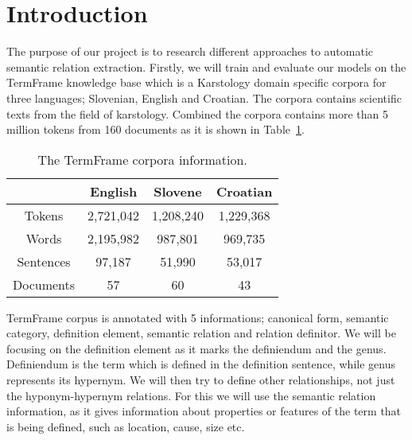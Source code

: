 \documentclass[fleqn,moreauthors,10pt]{ds_report}
\affiliation{\textit{Advisors: Slavko Žitnik}}
\begin{document}
\flushbottom 

\maketitle 

\thispagestyle{empty} 


\section*{Introduction}
		The purpose of our project is to research different approaches to automatic semantic relation extraction. Firstly, we will train and evaluate our models on the TermFrame knowledge base \cite{Vintar2019ModellingSK} which is a Karstology domain specific corpora for three languages; Slovenian, English and Croatian. The corpora contains scientific texts from the field of karstology. Combined the corpora contains more than 5 million tokens from 160 documents as it is shown in Table~\ref{table:1}. 
		\begin{table}[h]
		\begin{center}
            \begin{tabular}{ | c| c| c | c |} 
              \hline
               & English & Slovene & Croatian \\ 
              \hline
              Tokens & 2,721,042  & 1,208,240 & 1,229,368 \\ 
              \hline
              Words & 2,195,982  & 987,801 & 969,735 \\ 
              \hline
              Sentences & 97,187 & 51,990 & 53,017 \\ 
              \hline
              Documents & 57  & 60 & 43 \\ 
              \hline
            \end{tabular}
            \caption{The TermFrame corpora information.}
            \label{table:1}
        \end{center}
        \end{table}
        TermFrame corpus is annotated with 5 informations; canonical form, semantic category, definition element, semantic relation and relation definitor. We will be focusing on the definition element as it marks the definiendum and the genus. Definiendum is the term which is defined in the definition sentence, while genus represents its hypernym. We will then try to define other relationships, not just the hyponym-hypernym relations. For this we will use the semantic relation information, as it gives information about properties or features of the term that is being defined, such as location, cause, size etc.
\end{document}
